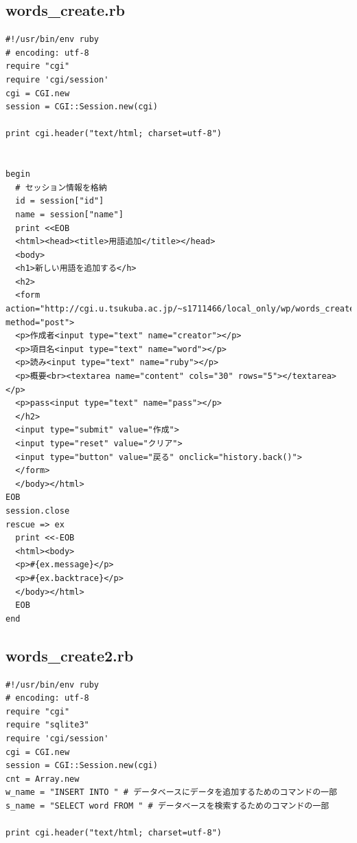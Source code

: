 \documentclass[12pt,a4paper]{jarticle}
\begin{document}
\begin{ttfamily}
\subsection*{words\_create.rb}
\begin{oframed}
 \fontsize{8pt}{8pt}\selectfont
 \begin{verbatim}
#!/usr/bin/env ruby
# encoding: utf-8
require "cgi"
require 'cgi/session'
cgi = CGI.new
session = CGI::Session.new(cgi)

print cgi.header("text/html; charset=utf-8")


begin
  # セッション情報を格納
  id = session["id"]
  name = session["name"]
  print <<EOB
  <html><head><title>用語追加</title></head>
  <body>
  <h1>新しい用語を追加する</h>
  <h2>
  <form action="http://cgi.u.tsukuba.ac.jp/~s1711466/local_only/wp/words_create2.rb" method="post">
  <p>作成者<input type="text" name="creator"></p>
  <p>項目名<input type="text" name="word"></p>
  <p>読み<input type="text" name="ruby"></p>
  <p>概要<br><textarea name="content" cols="30" rows="5"></textarea></p>
  <p>pass<input type="text" name="pass"></p>
  </h2>
  <input type="submit" value="作成">
  <input type="reset" value="クリア">
  <input type="button" value="戻る" onclick="history.back()">
  </form>
  </body></html>
EOB
session.close
rescue => ex
  print <<-EOB
  <html><body>
  <p>#{ex.message}</p>
  <p>#{ex.backtrace}</p>
  </body></html>
  EOB
end
 \end{verbatim}
\end{oframed}

\subsection*{words\_create2.rb}
\begin{oframed}
 \fontsize{8pt}{8pt}\selectfont
 \begin{verbatim}
#!/usr/bin/env ruby
# encoding: utf-8
require "cgi"
require "sqlite3"
require 'cgi/session'
cgi = CGI.new
session = CGI::Session.new(cgi)
cnt = Array.new
w_name = "INSERT INTO " # データベースにデータを追加するためのコマンドの一部
s_name = "SELECT word FROM " # データベースを検索するためのコマンドの一部

print cgi.header("text/html; charset=utf-8")



\end{verbatim}
\end{oframed}
\end{ttfamily}
\end{document}

